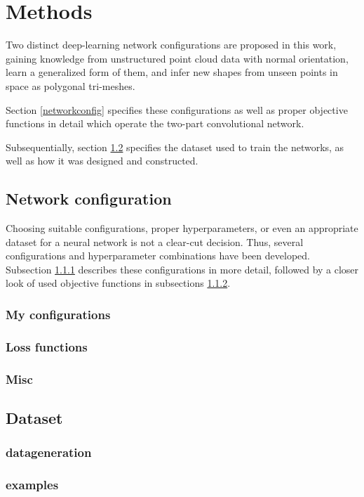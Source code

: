 \chapter{Methods}
\label{sec:methods}
Two distinct deep-learning network configurations are proposed in this work,
 gaining knowledge from unstructured point cloud data with normal orientation,
  learn a generalized form of them, and infer new shapes from unseen
   points in space as polygonal tri-meshes.

Section \ref{networkconfig} specifies these configurations as well as
 proper objective functions in detail which operate the two-part
  convolutional network.

Subsequentially, section \ref{dataset} specifies the dataset used to
 train the networks, as well as how it was designed and constructed.

\section{Network configuration}
Choosing suitable configurations, proper hyperparameters,
 or even an appropriate dataset for a neural network is not a clear-cut decision. 
 Thus, several configurations and hyperparameter combinations have been developed.
  Subsection \ref{configs} describes these configurations in more detail, followed by a
   closer look of used objective functions in subsections \ref{loss}.
\label{networkconfig}
\subsection{My configurations}
\label{configs}
\subsection{Loss functions}
\label{loss}
\subsection{Misc}
\label{misc}
\section{Dataset}
\label{dataset}
\subsection{datageneration}
\subsection{examples}
